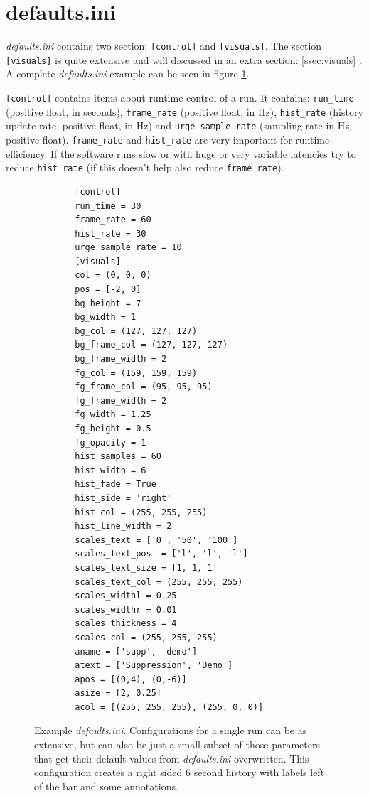 \documentclass[12pt,a4paper]{book}
\begin{document}
\section{defaults.ini}

\textit{defaults.ini} contains two section: \verb|[control]| and \verb|[visuals]|. The section \verb|[visuals]| is quite extensive and will discussed in an extra section: \ref{ssec:visuals} . A complete \textit{defaults.ini} example can be seen in figure \ref{fig:defaultsini}.

\verb|[control]| contains items about runtime control of a run. It contains: \verb|run_time| (positive float, in seconds), \verb|frame_rate| (positive float, in Hz), \verb|hist_rate| (history update rate, positive float, in Hz) and \verb|urge_sample_rate| (sampling rate in Hz, positive float). \verb|frame_rate| and \verb|hist_rate| are very important for runtime efficiency. If the software runs slow or with huge or very variable latencies try to reduce \verb|hist_rate| (if this doesn't help also reduce \verb|frame_rate|).

\begin{figure}
	\begin{framed}
		\begin{verbatim}
		[control]
		run_time = 30
		frame_rate = 60
		hist_rate = 30
		urge_sample_rate = 10
		[visuals]
		col = (0, 0, 0)
		pos = [-2, 0]
		bg_height = 7
		bg_width = 1
		bg_col = (127, 127, 127)
		bg_frame_col = (127, 127, 127)
		bg_frame_width = 2
		fg_col = (159, 159, 159)
		fg_frame_col = (95, 95, 95)
		fg_frame_width = 2
		fg_width = 1.25
		fg_height = 0.5
		fg_opacity = 1
		hist_samples = 60
		hist_width = 6
		hist_fade = True
		hist_side = 'right'
		hist_col = (255, 255, 255)
		hist_line_width = 2
		scales_text = ['0', '50', '100']
		scales_text_pos  = ['l', 'l', 'l']
		scales_text_size = [1, 1, 1]
		scales_text_col = (255, 255, 255)
		scales_widthl = 0.25
		scales_widthr = 0.01
		scales_thickness = 4
		scales_col = (255, 255, 255)
		aname = ['supp', 'demo']
		atext = ['Suppression', 'Demo']
		apos = [(0,4), (0,-6)]
		asize = [2, 0.25]
		acol = [(255, 255, 255), (255, 0, 0)]
		\end{verbatim}
	\end{framed}
	\caption{Example \textit{defaults.ini}. Configurations for a single run can be as extensive, but can also be just a small subset of those parameters that get their default values from \textit{defaults.ini} overwritten. This configuration creates a right sided 6 second history with labels left of the bar and some annotations.}
	\label{fig:defaultsini}
\end{figure}
\end{document}
